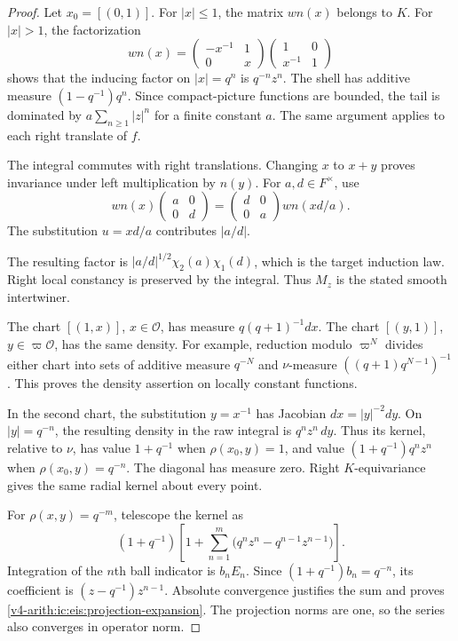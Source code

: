\begin{proof}
Let $x_0=[(0,1)]$.
For $|x|\le1$, the matrix $wn(x)$ belongs to $K$.
For $|x|>1$, the factorization
\[
 wn(x)=
 \begin{pmatrix}-x^{-1}&1\\0&x\end{pmatrix}
 \begin{pmatrix}1&0\\x^{-1}&1\end{pmatrix}
\]
shows that the inducing factor on $|x|=q^n$ is $q^{-n}z^n$.
The shell has additive measure $(1-q^{-1})q^n$.
Since compact-picture functions are bounded, the tail is dominated by
$a\sum_{n\ge1}|z|^n$ for a finite constant $a$.
The same argument applies to each right translate of $f$.

The integral commutes with right translations.
Changing $x$ to $x+y$ proves invariance under left multiplication by $n(y)$.
For $a,d\in F^\times$, use
\[
 wn(x)\begin{pmatrix}a&0\\0&d\end{pmatrix}
 =\begin{pmatrix}d&0\\0&a\end{pmatrix}wn(xd/a).
\]
The substitution $u=xd/a$ contributes $|a/d|$.

The resulting factor is $|a/d|^{1/2}\chi_2(a)\chi_1(d)$,
which is the target induction law.
Right local constancy is preserved by the integral.
Thus $M_z$ is the stated smooth intertwiner.

The chart $[(1,x)]$, $x\in\mathcal O$, has measure
$q(q+1)^{-1}dx$.
The chart $[(y,1)]$, $y\in\varpi\mathcal O$, has the same density.
For example, reduction modulo $\varpi^N$ divides either chart into
sets of additive measure $q^{-N}$ and $\nu$-measure
$((q+1)q^{N-1})^{-1}$.
This proves the density assertion on locally constant functions.

In the second chart, the substitution $y=x^{-1}$ has Jacobian
$dx=|y|^{-2}dy$.
On $|y|=q^{-n}$, the resulting density in the raw integral is
$q^nz^n\,dy$.
Thus its kernel, relative to $\nu$, has value $1+q^{-1}$ when
$\rho(x_0,y)=1$, and value $(1+q^{-1})q^nz^n$ when
$\rho(x_0,y)=q^{-n}$.
The diagonal has measure zero.
Right $K$-equivariance gives the same radial kernel about every point.

For $\rho(x,y)=q^{-m}$, telescope the kernel as
\[
 (1+q^{-1})\left[
 1+\sum_{n=1}^{m}\bigl(q^nz^n-q^{n-1}z^{n-1}\bigr)\right].
\]
Integration of the $n$th ball indicator is $b_nE_n$.
Since $(1+q^{-1})b_n=q^{-n}$, its coefficient is
$(z-q^{-1})z^{n-1}$.
Absolute convergence justifies the sum and proves
\eqref{v4-arith:ic:eis:projection-expansion}.
The projection norms are one, so the series also converges in operator norm.


\end{proof}
